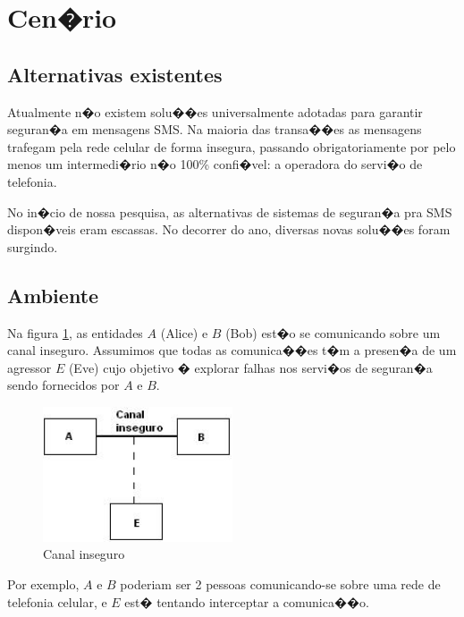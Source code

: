 \documentclass[a4paper,capchap,espacoduplo,normaltoc]{abntepusp}
\begin{document}
\section{Cen�rio} %

\subsection{Alternativas existentes}
Atualmente n�o existem solu��es universalmente adotadas para garantir seguran�a em mensagens SMS. Na maioria das transa��es as mensagens trafegam pela rede celular de forma insegura, passando obrigatoriamente por pelo menos um intermedi�rio n�o 100\% confi�vel: a operadora do servi�o de telefonia.

No in�cio de nossa pesquisa, as alternativas de sistemas de seguran�a pra SMS dispon�veis eram escassas. No decorrer do ano, diversas novas solu��es foram surgindo. %


\subsection{Ambiente}
Na figura \ref{fig:Canal_Inseguro}, as entidades $A$ (Alice) e $B$ (Bob) est�o se comunicando sobre um canal inseguro. Assumimos que todas as comunica��es t�m a presen�a de um agressor $E$ (Eve) cujo objetivo � explorar falhas nos servi�os de seguran�a sendo fornecidos por $A$ e $B$.

\begin{figure}[h]
	\centering
	\includegraphics[width=0.50\textwidth]{figuras/Canal_Inseguro.jpg}
	\caption{Canal inseguro}
	\label{fig:Canal_Inseguro}
\end{figure}

Por exemplo, $A$ e $B$ poderiam ser 2 pessoas comunicando-se sobre uma rede de telefonia celular, e $E$ est� tentando interceptar a comunica��o. 
\end{document}
